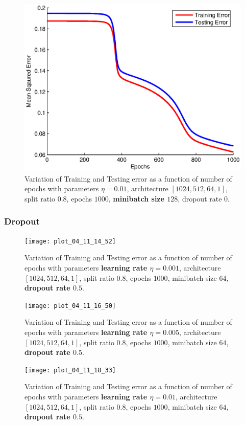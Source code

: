 \documentclass{article}
\newcommand{\myScale}{0.56}
\begin{document}
\begin{figure}[H]
\includegraphics[scale=\myScale]{../q2/part2_128}
\caption{Variation of Training and Testing error as a function of number of epochs with parameters $\eta=0.01$, architecture $[1024,512,64,1]$, split ratio $0.8$, epochs $1000$, {\bf minibatch size $128$}, dropout rate $0$.}
\label{fig:fig19}
\end{figure}
\subsubsection{Dropout}
\begin{figure}[H]
\texttt{[image: plot\_04\_11\_14\_52]}
\caption{Variation of Training and Testing error as a function of number of epochs with parameters {\bf learning rate $\eta=0.001$}, architecture $[1024,512,64,1]$, split ratio $0.8$, epochs $1000$, minibatch size $64$, {\bf dropout rate $0.5$}.}
\label{fig:fig20}
\end{figure}
\begin{figure}[H]
\texttt{[image: plot\_04\_11\_16\_50]}
\caption{Variation of Training and Testing error as a function of number of epochs with parameters {\bf learning rate $\eta=0.005$}, architecture $[1024,512,64,1]$, split ratio $0.8$, epochs $1000$, minibatch size $64$, {\bf dropout rate $0.5$}.}
\label{fig:fig21}
\end{figure}
\begin{figure}[H]
\texttt{[image: plot\_04\_11\_18\_33]}
\caption{Variation of Training and Testing error as a function of number of epochs with parameters {\bf learning rate $\eta=0.01$}, architecture $[1024,512,64,1]$, split ratio $0.8$, epochs $1000$, minibatch size $64$, {\bf dropout rate $0.5$}.}
\label{fig:fig22}
\end{figure}
\end{document}
